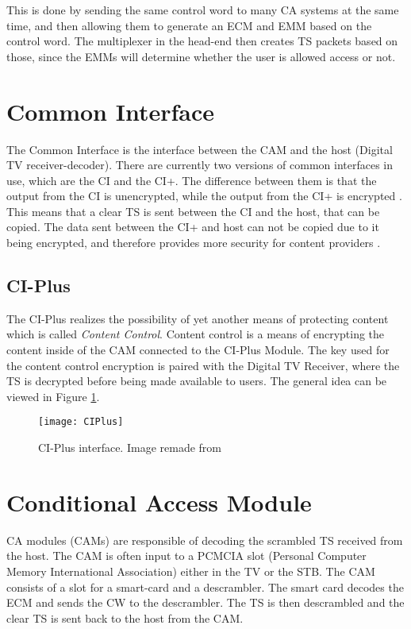 This is done by sending the same control word to many CA systems at 
the same time, and then allowing them to generate an ECM and EMM based 
on the control word. The multiplexer in the head-end then creates TS 
packets based on those, since the EMMs will determine whether the user 
is allowed access or not. 


\section{Common Interface} \label{sec:CI}
The Common Interface is the interface between the CAM and the host 
(Digital TV receiver-decoder). There are currently two versions of 
common interfaces in use, which are the CI and the CI+. The difference 
between them is that the output from the CI is unencrypted, while the 
output from the CI+ is encrypted \citep{CI+:2011}. This means that a 
clear TS is sent between the CI and the host, that can be copied. The 
data sent between the CI+ and host can not be copied due to it being 
encrypted, and therefore provides more security for content providers 
\citep{CI:1997}.

\subsection{CI-Plus}
The CI-Plus realizes the possibility of yet another means of protecting 
content which is called \emph{Content Control}. Content control is a 
means of encrypting the content inside of the CAM connected to the 
CI-Plus Module. The key used for the content control encryption is 
paired with the Digital TV Receiver, where the TS is decrypted before 
being made available to users. The general idea can be viewed in Figure 
\ref{img:CIPlus}.

\begin{figure}
  \centering
  \texttt{[image: CIPlus]}
  \caption{CI-Plus interface. Image remade from \citep[p. 10]{CI+:2011}}
  \label{img:CIPlus}
\end{figure}


\section{Conditional Access Module}\label{sec:CAM}
CA modules (CAMs) are responsible of decoding the scrambled TS 
received from the host. The CAM is often input to a PCMCIA slot 
(Personal Computer Memory International Association) either in the TV 
or the STB. The CAM consists of a slot for a smart-card and a 
descrambler. The smart card decodes the ECM and sends the CW to the 
descrambler. The TS is then descrambled and the clear TS is sent back 
to the host from the CAM.
